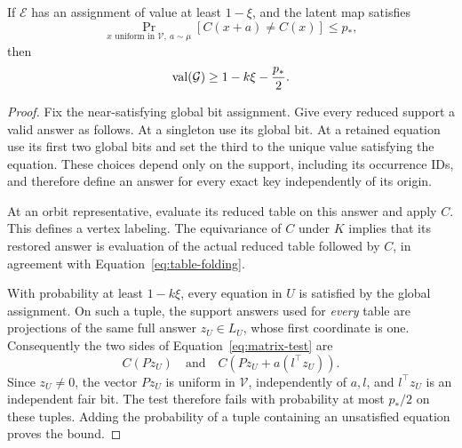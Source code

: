 \begin{lemma}
\label{lem:outer-completeness}
If \(\mathcal E\) has an assignment of value at least \(1-\xi\), and
the latent map satisfies
\[
 \Pr_{x\text{ uniform in }\mathcal V,\ a\sim\mu}
       [C(x+a)\ne C(x)]\le p_*,
\]
then
\[
 \operatorname{val}(\mathcal G)\ge 1-k\xi-\frac{p_*}{2}.
\]
\end{lemma}

\begin{proof}
Fix the near-satisfying global bit assignment.  Give every reduced
support a valid answer as follows.  At a singleton use its global bit.
At a retained equation use its first two global bits and set the third
to the unique value satisfying the equation.  These choices depend only
on the support, including its occurrence IDs, and therefore define an
answer for every exact key independently of its origin.

At an orbit representative, evaluate its reduced table on this answer
and apply \(C\).  This defines a vertex labeling.  The equivariance of
\(C\) under \(K\) implies that its restored answer is evaluation of
the actual reduced table followed by \(C\), in agreement with
Equation~\eqref{eq:table-folding}.

With probability at least \(1-k\xi\), every equation in \(U\) is
satisfied by the global assignment.  On such a tuple, the support
answers used for \emph{every} table are projections of the same full
answer \(z_U\in L_U\), whose first coordinate is one.  Consequently
the two sides of Equation~\eqref{eq:matrix-test} are
\[
 C(Pz_U)\quad\text{and}\quad
 C(Pz_U+a(l^\top z_U)).
\]
Since \(z_U\ne0\), the vector \(Pz_U\) is uniform in
\(\mathcal V\), independently of \(a,l\), and \(l^\top z_U\) is
an independent fair bit.  The test therefore fails with probability at
most \(p_*/2\) on these tuples.  Adding the probability of a tuple
containing an unsatisfied equation proves the bound.
\end{proof}
